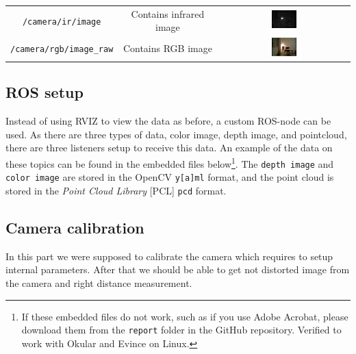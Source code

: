 \documentclass[11pt]{article}
\begin{document}
\begin{table}[h!]
\begin{center}
\begin{tabular}{ccc}
      \texttt{/camera/ir/image} &
      Contains infrared image & 
      \includegraphics[width=0.2\textwidth]{figures/ir-image-raw.png}\\
      
      \texttt{/camera/rgb/image_raw} &
      Contains RGB image & 
      \includegraphics[width=0.2\textwidth]{figures/rgb-image-raw.png}\\
      \bottomrule
    \end{tabular}
  \end{center}

\end{table}



\subsection{ROS setup}
Instead of using RVIZ to view the data as before, a custom ROS-node can be used. As there are three types of data, color image, depth image, and pointcloud, there are three listeners setup to receive this data. An example of the data on these topics can be found in the embedded files below\footnote{If these embedded files do not work, such as if you use Adobe Acrobat, please download them from the \texttt{report} folder in the GitHub repository. Verified to work with Okular and Evince on Linux.}. The \texttt{depth image} and \texttt{color image} are stored in the OpenCV \texttt{y[a]ml} format, and the point cloud is stored in the \emph{Point Cloud Library} [PCL] \texttt{pcd} format.\par

\begin{center}
\end{center}

\subsection{Camera calibration}
	In this part we were supposed to calibrate the camera which requires to setup internal parameters. After that we should be able to get not distorted image from the camera and right distance measurement. \par
\end{document}
